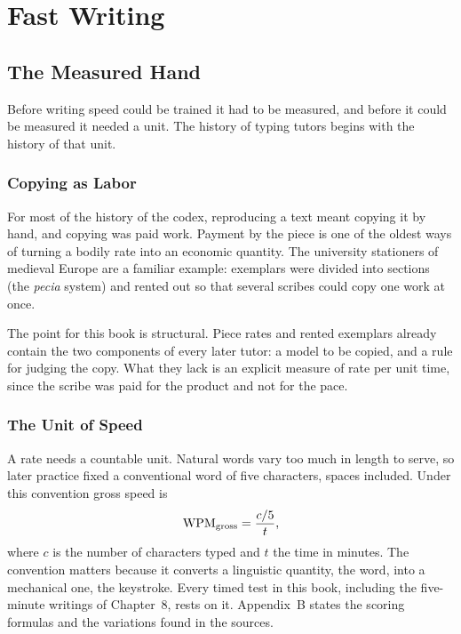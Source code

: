 \part{Fast Writing}

\chapter{The Measured Hand}

Before writing speed could be trained it had to be measured, and before it could be measured it needed a unit. The history of typing tutors begins with the history of that unit.

\section{Copying as Labor}

For most of the history of the codex, reproducing a text meant copying it by hand, and copying was paid work. Payment by the piece is one of the oldest ways of turning a bodily rate into an economic quantity. The university stationers of medieval Europe are a familiar example: exemplars were divided into sections (the \emph{pecia} system) and rented out so that several scribes could copy one work at once. 

The point for this book is structural. Piece rates and rented exemplars already contain the two components of every later tutor: a model to be copied, and a rule for judging the copy. What they lack is an explicit measure of rate per unit time, since the scribe was paid for the product and not for the pace.

\section{The Unit of Speed}

A rate needs a countable unit. Natural words vary too much in length to serve, so later practice fixed a conventional word of five characters, spaces included. Under this convention gross speed is
\[
\operatorname{WPM}_{\text{gross}}=\frac{c/5}{t},
\]
where $c$ is the number of characters typed and $t$ the time in minutes. The convention matters because it converts a linguistic quantity, the word, into a mechanical one, the keystroke. Every timed test in this book, including the five-minute writings of Chapter~8, rests on it. Appendix~B states the scoring formulas and the variations found in the sources.

